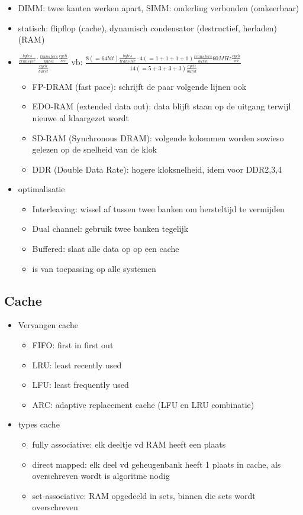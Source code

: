 \documentclass[11pt]{article}
\let\originalitem\item
\renewcommand{\item}{\originalitem[]}
\newcommand{\Newpage}{\end{preview}\begin{preview}}
\begin{document}
\begin{preview}
\begin{itemize}
	\item DIMM: twee kanten werken apart, SIMM: onderling verbonden (omkeerbaar)
	\item statisch: flipflop (cache), dynamisch condensator (destructief, herladen) (RAM)
	\item $\frac{\frac{bytes}{transfer}\cdot \frac{transfers}{burst}\frac{cycli}{sec}}{\frac{cycli}{burst}}$ vb: $\frac{8 (=64 bit) \frac{bytes}{transfer}\cdot 4 (=1+1+1+1) \frac{transfers}{burst} 60 MHz \frac{cycli}{sec}}{14 (=5+3+3+3) \frac{cycli}{burst}}$
	\begin{itemize}
		\item FP-DRAM (fast pace): schrijft de paar volgende lijnen ook
		\item EDO-RAM (extended data out): data blijft staan op de uitgang terwijl nieuwe al klaargezet wordt
		\item SD-RAM (Synchronous DRAM): volgende kolommen worden sowieso gelezen op de snelheid van de klok
		\item DDR (Double Data Rate): hogere kloksnelheid, idem voor DDR2,3,4
	\end{itemize}
	\item optimalisatie
	\begin{itemize}
		\item Interleaving: wissel af tussen twee banken om hersteltijd te vermijden
		\item Dual channel: gebruik twee banken tegelijk
		\item Buffered: slaat alle data op op een cache
		\item is van toepassing op alle systemen
	\end{itemize}
\end{itemize}

\Newpage

\subsection{Cache}

\begin{itemize}
	\item Vervangen cache
	\begin{itemize}
		\item FIFO: first in first out 
		\item LRU: least recently used
		\item LFU: least frequently used
		\item ARC: adaptive replacement cache (LFU en LRU combinatie)
	\end{itemize}
	\item types cache
	\begin{itemize}
		\item fully associative: elk deeltje vd RAM heeft een plaats
		\item direct mapped:  elk deel vd geheugenbank heeft 1 plaats in cache, als overschreven wordt is algoritme nodig
		\item set-associative: RAM opgedeeld in sets, binnen die sets wordt overschreven
	\end{itemize}
\end{itemize}


\end{preview}
\end{document}
